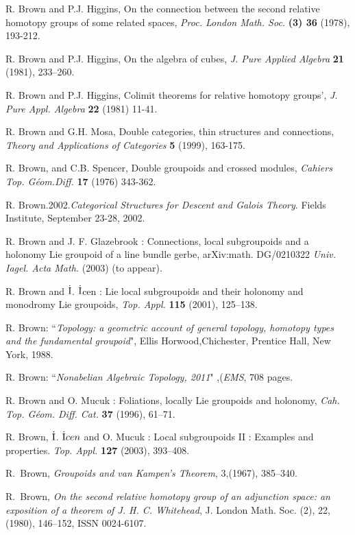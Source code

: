 \documentclass[12pt]{article}
\theoremstyle{definition}
\theoremstyle{remark}
\numberwithin{equation}{subsection}
\begin{document}
\begin{thebibliography}{99}
 R. Brown  and P.J. Higgins, On the connection between the second relative %
homotopy groups of some related spaces,  {\em Proc. London Math. Soc.} \textbf{ (3) 36} %
(1978), 193-212.

 R. Brown and P.J. Higgins, On the algebra of cubes, {\em J. Pure Applied %
Algebra} \textbf{21 }(1981), 233--260.

 R. Brown  and P.J. Higgins, Colimit theorems for relative homotopy groups', %
{\em J. Pure Appl. Algebra} \textbf{22} (1981) 11-41.

R. Brown  and G.H. Mosa, Double categories, thin structures and connections,{\it %
Theory and Applications of Categories}  {\bf 5} (1999), 163-175.

R. Brown,  and C.B. Spencer, Double groupoids and crossed modules, {\it 
Cahiers Top. G\'eom.Diff.} {\bf 17} (1976) 343-362.

R. Brown.2002.\emph{Categorical Structures for Descent and Galois Theory}. Fields Institute, September 23-28, 2002.

R. Brown and J. F. Glazebrook : Connections, local subgroupoids and a holonomy Lie groupoid of a line bundle gerbe, arXiv:math. DG/0210322 \emph{Univ. Iagel. Acta Math.} (2003) (to appear).


R. Brown and $\dot{\rm I}$. $\dot{\rm I}$cen : Lie local subgroupoids and their holonomy and monodromy Lie groupoids,
\emph{Top. Appl.} \textbf{115} (2001), 125--138.


R. Brown: ``{\em Topology: a geometric account of general topology, homotopy types and 
the fundamental groupoid}", Ellis Horwood,Chichester, Prentice Hall, New York, 1988.

R. Brown: ``{\em Nonabelian Algebraic Topology, 2011}" ,(\emph{EMS}, 708 pages.

R. Brown and O. Mucuk : Foliations, locally Lie groupoids and
holonomy, \emph{Cah. Top. G\'eom. Diff. Cat.} {\bf 37} (1996),
61--71.


R. Brown, $\dot{\rm I}$. $\dot{\rm I}cen$ and O. Mucuk : Local
subgroupoids II : Examples and properties. \emph{Top. Appl.}
{\bf 127} (2003), 393--408.

R.~{B}rown, {\em Groupoids and {van Kampen}'s Theorem}, 3,(1967), 385--340.

R.~Brown, {\em On the second relative homotopy group of an
adjunction space: an exposition of a theorem of {J}. {H}. {C}. {W}hitehead}, J. London Math.
  Soc. (2), 22, (1980), 146--152, ISSN 0024-6107.


\end{thebibliography}
\end{document}
